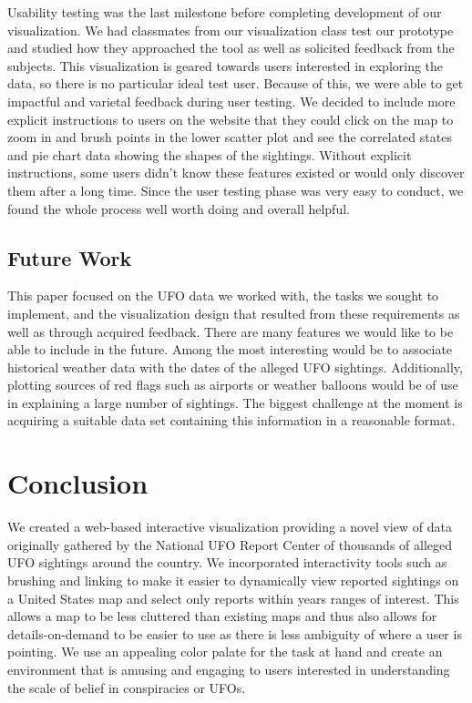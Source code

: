 \documentclass[journal]{vgtc}                %
\begin{document}
Usability testing was the last milestone before completing development of our visualization. We had classmates from our visualization class test our prototype and studied how they approached the tool as well as solicited feedback from the subjects. This visualization is geared towards users interested in exploring the data, so there is no particular ideal test user. Because of this, we were able to get impactful and varietal feedback during user testing. We decided to include more explicit instructions to users on the website that they could click on the map to zoom in and brush points in the lower scatter plot and see the correlated states and pie chart data showing the shapes of the sightings. Without explicit instructions, some users didn't know these features existed or would only discover them after a long time. Since the user testing phase was very easy to conduct, we found the whole process well worth doing and overall helpful.


\subsection{Future Work}
This paper focused on the UFO data we worked with, the tasks we sought to implement, and the visualization design that resulted from these requirements as well as through acquired feedback. There are many features we would like to be able to include in the future. Among the most interesting would be to associate historical weather data with the dates of the alleged UFO sightings. Additionally, plotting sources of red flags such as airports or weather balloons would be of use in explaining a large number of sightings. The biggest challenge at the moment is acquiring a suitable data set containing this information in a reasonable format. 


\section{Conclusion}
We created a web-based interactive visualization providing a novel view of data originally gathered by the National UFO Report Center of thousands of alleged UFO sightings around the country. We incorporated interactivity tools such as brushing and linking to make it easier to dynamically view reported sightings on a United States map and select only reports within years ranges of interest. This allows a map to be less cluttered than existing maps and thus also allows for details-on-demand to be easier to use as there is less ambiguity of where a user is pointing. We use an appealing color palate for the task at hand and create an environment that is amusing and engaging to users interested in understanding the scale of belief in conspiracies or UFOs.
\end{document}
